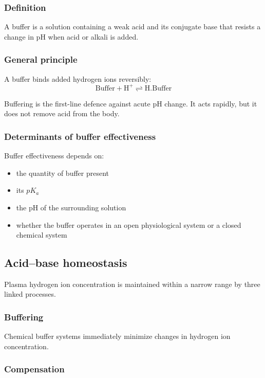 \documentclass[11pt,a4paper]{article}
\begin{document}
\subsubsection{Definition}

A buffer is a solution containing a weak acid and its conjugate base that resists a change in pH when acid or alkali is added.

\subsubsection{General principle}

A buffer binds added hydrogen ions reversibly:
\[
\mathrm{Buffer + H^+ \rightleftharpoons H.Buffer}
\]

Buffering is the first-line defence against acute pH change. It acts rapidly, but it does not remove acid from the body.

\subsubsection{Determinants of buffer effectiveness}

Buffer effectiveness depends on:

\begin{itemize}
    \item the quantity of buffer present
    \item its \(pK_a\)
    \item the pH of the surrounding solution
    \item whether the buffer operates in an open physiological system or a closed chemical system
\end{itemize}

\subsection{Acid--base homeostasis}

Plasma hydrogen ion concentration is maintained within a narrow range by three linked processes.

\subsubsection{Buffering}

Chemical buffer systems immediately minimize changes in hydrogen ion concentration.

\subsubsection{Compensation}
\end{document}
